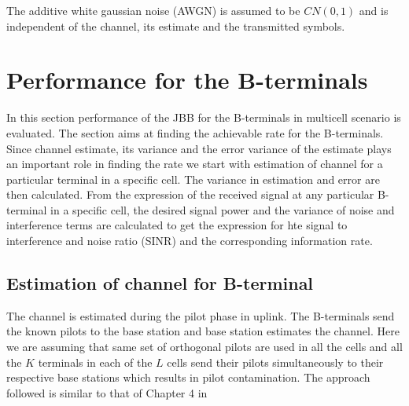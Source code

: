 \documentclass[10pt, a4paper, twoside,fleqn]{article}
\begin{document}
The additive white gaussian noise (AWGN) is assumed to be $CN(0,1)$ and is independent of the channel, its estimate and the transmitted symbols.

\section{Performance for the B-terminals}
	In this section performance of the JBB for the B-terminals in multicell scenario is evaluated. The section aims at finding the achievable rate for the B-terminals. Since channel estimate, its variance and the error variance of the estimate plays an important role in finding the rate we start with estimation of channel for a particular terminal in a specific cell. The variance in estimation and error are then calculated. From the expression of the received signal at any particular B-terminal in a specific cell, the desired signal power and the variance of noise and interference terms are calculated to get the expression for hte signal to interference and noise ratio (SINR) and the corresponding information rate.

\subsection{Estimation of channel for B-terminal} \label{sec:btchesti}
	The channel is estimated during the pilot phase in uplink. The B-terminals send the known pilots to the base station and base station estimates the channel. Here we are assuming that same set of orthogonal pilots are used in all the cells and all the $K$ terminals in each of the $L$ cells send their pilots simultaneously to their respective base stations which results in pilot contamination. The approach followed is similar to that of Chapter 4 in \cite{bib:MassiveMimoBook}
\end{document}
